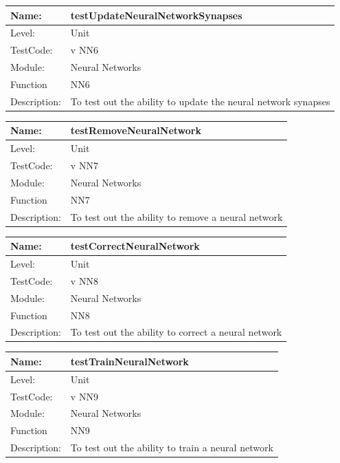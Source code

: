 \documentclass[12pt]{article}
\begin{document}
\begin{center}
\begin{tabular}{|l|p{12cm}|}
\hline

 Name: & testUpdateNeuralNetworkSynapses \\
 \hline
Level: & Unit \\
\hline
TestCode: & v NN6 \\
\hline
Module:& Neural Networks \\
\hline
Function & NN6 \\
\hline
Description: & To test out the ability to update the neural network synapses  \\
\hline
\end{tabular}
\end{center}

\begin{center}
\begin{tabular}{|l|p{12cm}|}
\hline

 Name: & testRemoveNeuralNetwork \\
 \hline
Level: & Unit \\
\hline
TestCode: & v NN7 \\
\hline
Module:& Neural Networks \\
\hline
Function & NN7 \\
\hline
Description: & To test out the ability to remove a neural network   \\
\hline
\end{tabular}
\end{center}


\begin{center}
\begin{tabular}{|l|p{12cm}|}
\hline

 Name: & testCorrectNeuralNetwork \\
 \hline
Level: & Unit \\
\hline
TestCode: & v NN8 \\
\hline
Module:& Neural Networks \\
\hline
Function & NN8 \\
\hline
Description: & To test out the ability to correct a neural network   \\
\hline
\end{tabular}
\end{center}


\begin{center}
\begin{tabular}{|l|p{12cm}|}
\hline

 Name: & testTrainNeuralNetwork \\
 \hline
Level: & Unit \\
\hline
TestCode: & v NN9 \\
\hline
Module:& Neural Networks \\
\hline
Function & NN9 \\
\hline
Description: & To test out the ability to train a neural network   \\
\hline
\end{tabular}
\end{center}
\end{document}
